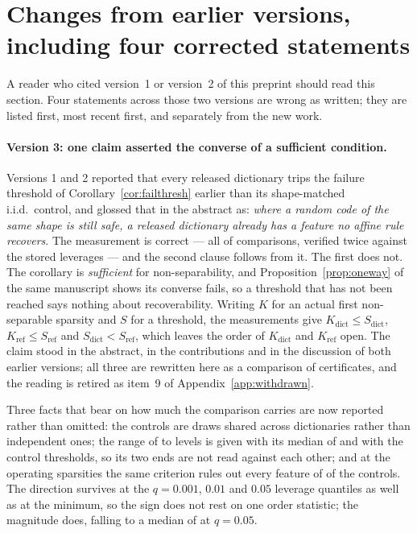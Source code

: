 \section*{Changes from earlier versions, including four corrected statements}

A reader who cited version~1 or version~2 of this preprint should read this section. Four statements
across those two versions are wrong as written; they are listed first, most recent first, and
separately from the new work.

\paragraph{Version 3: one claim asserted the converse of a sufficient condition.} Versions 1 and 2
reported that every released dictionary trips the failure threshold of
Corollary~\ref{cor:failthresh} earlier than its shape-matched i.i.d.\ control, and glossed that in
the abstract as: \emph{where a random code of the same shape is still safe, a released dictionary
already has a feature no affine rule recovers}. The measurement is correct --- all
\SaeFailEarlier{} of \SaeDicts{} comparisons, verified twice against the stored leverages --- and
the second clause follows from it. The first does not. The corollary is \emph{sufficient} for
non-separability, and Proposition~\ref{prop:oneway} of the same manuscript shows its converse
fails, so a threshold that has not been reached says nothing about recoverability. Writing $K$ for
an actual first non-separable sparsity and $S$ for a threshold, the measurements give
$K_{\text{dict}}\le S_{\text{dict}}$, $K_{\text{ref}}\le S_{\text{ref}}$ and
$S_{\text{dict}}<S_{\text{ref}}$, which leaves the order of $K_{\text{dict}}$ and $K_{\text{ref}}$
open. The claim stood in the abstract, in the contributions and in the discussion of both earlier
versions; all three are rewritten here as a comparison of certificates, and the reading is retired
as item~9 of Appendix~\ref{app:withdrawn}.

Three facts that bear on how much the comparison carries are now reported rather than omitted: the
controls are \SaeFailRefs{} draws shared across \SaeDicts{} dictionaries rather than \SaeDicts{}
independent ones; the range of \SaeFailGapMin{} to \SaeFailGapMax{} levels is given with its median
of \SaeFailGapMedian{} and with the control thresholds, so its two ends are not read against each
other; and at the operating sparsities the same criterion rules out every feature of
\SaeFailCtlAllRuledOut{} of the \SaeFailRefs{} controls. The direction survives at the $q=0.001$,
$0.01$ and $0.05$ leverage quantiles as well as at the minimum, so the sign does not rest on one
order statistic; the magnitude does, falling to a median of \SaeFailQFiveGapMedian{} at $q=0.05$.

